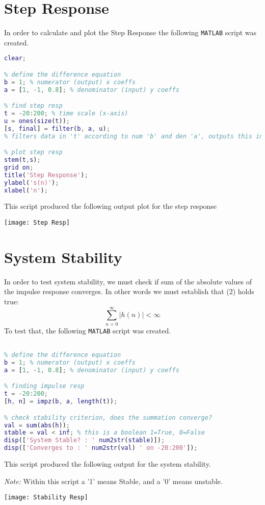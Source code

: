 \documentclass[]{report}
\begin{document}
\section*{Step Response}

In order to calculate and plot the Step Response the following \texttt{MATLAB} script was created.
\vspace{1em}

\begin{lstlisting}[frame=single, language=Matlab]
%% QUESTION 2
clear;

% define the difference equation
b = 1; % numerator (output) x coeffs
a = [1, -1, 0.8]; % denominator (input) y coeffs

% find step resp
t = -20:200; % time scale (x-axis)
u = ones(size(t));
[s, final] = filter(b, a, u); 
% filters data in 't' according to num 'b' and den 'a', outputs this in 'y'

% plot step resp
stem(t,s);
grid on;
title('Step Response');
ylabel('s(n)');
xlabel('n');

\end{lstlisting}

This script produced the following output plot for the step response
\vspace{1em}

\begin{center}
	\texttt{[image: Step Resp]}
\end{center}

\section*{System Stability}

In order to test system stability, we must check if sum of the absolute values of the impulse response converges.
In other words we must establish that (2) holds true:
\begin{equation}
	\sum_{n=0}^{\infty} \left| h(n) \right| < \infty
\end{equation}
To test that, the following \texttt{MATLAB} script was created.
\vspace{1em}

\begin{lstlisting}[frame=single, language=Matlab]
%% QUESTION 3

% define the difference equation
b = 1; % numerator (output) x coeffs
a = [1, -1, 0.8]; % denominator (input) y coeffs

% finding impulse resp
t = -20:200;
[h, n] = impz(b, a, length(t));

% check stability criterion, does the summation converge?
val = sum(abs(h));
stable = val < inf; % this is a boolean 1=True, 0=False
disp(['System Stable? : ' num2str(stable)]);
disp(['Converges to : ' num2str(val) ' on -20:200']);
\end{lstlisting}

This script produced the following output for the system stability. 

\textit{Note:} Within this script a '1' means Stable, and a '0' means unstable.

\begin{center}
	\texttt{[image: Stability Resp]}
\end{center}
\end{document}
